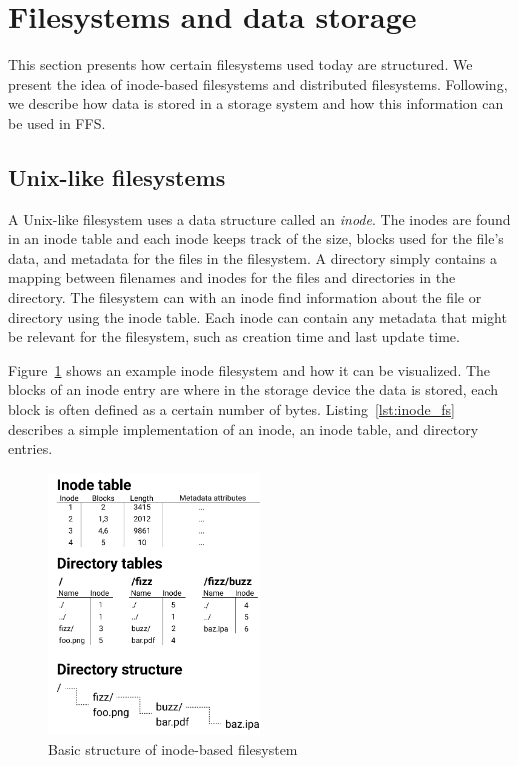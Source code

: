 \section{Filesystems and data storage}
This section presents how certain filesystems used today are structured. We present the idea of \mbox{inode-based} filesystems and distributed filesystems. Following, we describe how data is stored in a storage system and how this information can be used in \gls{FFS}.

\subsection{\mbox{Unix-like} filesystems}
A \mbox{Unix-like} filesystem uses a data structure called an \textit{inode}. The inodes are found in an inode table and each inode keeps track of the size, blocks used for the file's data, and metadata for the files in the filesystem. A directory simply contains a mapping between filenames and inodes for the files and directories in the directory. The filesystem can with an inode find information about the file or directory using the inode table. Each inode can contain any metadata that might be relevant for the filesystem, such as creation time and last update time. 

Figure~\ref{fig:inode_diag} shows an example inode filesystem and how it can be visualized. The blocks of an inode entry are where in the storage device the data is stored, each block is often defined as a certain number of bytes. Listing~\ref{lst:inode_fs} describes a simple implementation of an inode, an inode table, and directory entries. 

\begin{figure}[!ht]
	\begin{center}
	  \includegraphics[width=0.5\textwidth]{figures/inode_diagram.png}
	\end{center}
	\caption{Basic structure of \mbox{inode-based} filesystem}
	\label{fig:inode_diag}
\end{figure}

